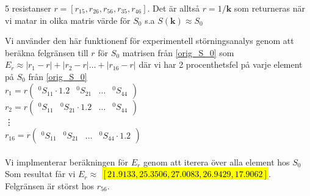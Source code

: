\documentclass{assignment}
\def\code#1{\texttt{#1}}
\begin{document}
5 resistanser $r = [r_{15},r_{26},r_{56},r_{35},r_{46}]$. Det är alltså $r=1/\mathbf{k}$ som returneras när vi matar in olika matris värde för $S_0$ s.a $S(\mathbf{k})\approx S_0$
 
Vi använder den här funktionenf för experimentell störningsanalys genom att beräkna felgränsen
till $r$ för $S_0$ matrisen från \cref{orig_S_0} som
$E_r \approx |r_1-r|+|r_2-r|\dots +|r_{16}-r|$ där vi har 2 procenthetsfel på varje element på $S_0$ från \cref{orig_S_0} 
\\ $r_{1}=r\begin{pmatrix}
    ^0S_{11}\cdot 1.2&^0S_{21}&\dots&^0S_{44}
\end{pmatrix}$
\\ $r_{2}=r\begin{pmatrix}
    ^0S_{11}&^0S_{21}\cdot 1.2&\dots&^0S_{44}
\end{pmatrix}$
\\ \vdots
\\ $r_{16}=r\begin{pmatrix}
    ^0S_{11}&^0S_{21}&\dots&^0S_{44}\cdot 1.2
\end{pmatrix}$
\\
\\ Vi implmenterar beräkningen för $E_r$ genom att iterera över alla element hos $S_0$
\\  
Som resultat får vi $E_r\approx$ \hl{$[21.9133, 25.3506, 27.0083, 26.9429, 17.9062]$}. Felgränsen är störst hos $r_{56}.$
\newpage
\end{document}
